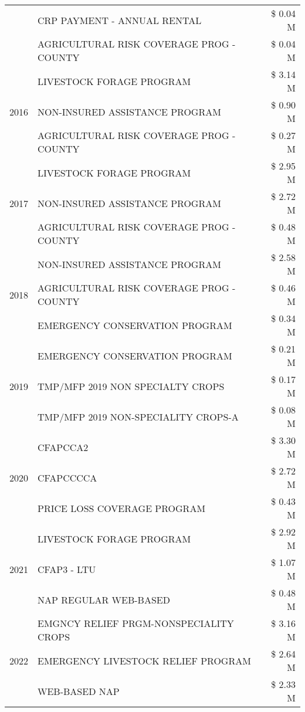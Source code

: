 \begin{tabular}{llr}
 & CRP PAYMENT - ANNUAL RENTAL & \$ 0.04 M \\
 & AGRICULTURAL RISK COVERAGE PROG - COUNTY & \$ 0.04 M \\
\cline{1-3}
\multirow[t]{3}{*}{2016} & LIVESTOCK FORAGE PROGRAM & \$ 3.14 M \\
 & NON-INSURED ASSISTANCE PROGRAM & \$ 0.90 M \\
 & AGRICULTURAL RISK COVERAGE PROG - COUNTY & \$ 0.27 M \\
\cline{1-3}
\multirow[t]{3}{*}{2017} & LIVESTOCK FORAGE PROGRAM & \$ 2.95 M \\
 & NON-INSURED ASSISTANCE PROGRAM & \$ 2.72 M \\
 & AGRICULTURAL RISK COVERAGE PROG - COUNTY & \$ 0.48 M \\
\cline{1-3}
\multirow[t]{3}{*}{2018} & NON-INSURED ASSISTANCE PROGRAM & \$ 2.58 M \\
 & AGRICULTURAL RISK COVERAGE PROG - COUNTY & \$ 0.46 M \\
 & EMERGENCY CONSERVATION PROGRAM & \$ 0.34 M \\
\cline{1-3}
\multirow[t]{3}{*}{2019} & EMERGENCY CONSERVATION PROGRAM & \$ 0.21 M \\
 & TMP/MFP 2019 NON SPECIALTY CROPS & \$ 0.17 M \\
 & TMP/MFP 2019 NON-SPECIALITY CROPS-A & \$ 0.08 M \\
\cline{1-3}
\multirow[t]{3}{*}{2020} & CFAPCCA2 & \$ 3.30 M \\
 & CFAPCCCCA & \$ 2.72 M \\
 & PRICE LOSS COVERAGE PROGRAM & \$ 0.43 M \\
\cline{1-3}
\multirow[t]{3}{*}{2021} & LIVESTOCK FORAGE PROGRAM & \$ 2.92 M \\
 & CFAP3 - LTU & \$ 1.07 M \\
 & NAP REGULAR WEB-BASED & \$ 0.48 M \\
\cline{1-3}
\multirow[t]{3}{*}{2022} & EMGNCY RELIEF PRGM-NONSPECIALITY CROPS & \$ 3.16 M \\
 & EMERGENCY LIVESTOCK RELIEF PROGRAM & \$ 2.64 M \\
 & WEB-BASED NAP & \$ 2.33 M \\
\cline{1-3}
\bottomrule
\end{tabular}
